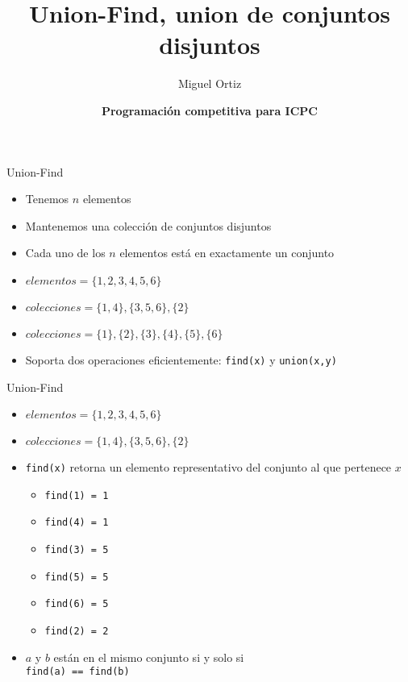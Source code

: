 \documentclass[10pt]{beamer}
\title{Union-Find, union de conjuntos disjuntos}
\author{Miguel Ortiz}
\institute{Mayo 2023 - Cochabamba, Bolivia}
\date{\textbf{Programación competitiva para ICPC}}
\newcommand{\bi}{\begin{itemize}}
\newcommand{\ei}{\end{itemize}}
\begin{document}
\maketitle

\begin{frame}[fragile]{Union-Find}
    \vspace{20pt}
    \bi
        \item Tenemos $n$ elementos
        \item Mantenemos una colección de conjuntos disjuntos
        \item Cada uno de los $n$ elementos está en exactamente un conjunto
        \vspace{10pt}
        \item $elementos = \{1,2,3,4,5,6\}$
        \item $colecciones = \{1,4\}, \{3,5,6\}, \{2\}$
        \item $colecciones = \{1\}, \{2\}, \{3\}, \{4\}, \{5\}, \{6\}$
        \vspace{10pt}
        \item Soporta dos operaciones eficientemente: \texttt{find(x)} y \texttt{union(x,y)}
    \ei
\end{frame}

\begin{frame}{Union-Find}
    \bi
        \vspace{10pt}
        \item $elementos = \{1,2,3,4,5,6\}$
        \item $colecciones = \{1,4\}, \{3,5,6\}, \{2\}$
        \vspace{10pt}
        \item \texttt{find(x)} retorna un elemento representativo del conjunto al que pertenece $x$
            \bi
                \vspace{5pt}
                \item \texttt{find(1) = 1}
                \item \texttt{find(4) = 1}
                \vspace{5pt}
                \item \texttt{find(3) = 5}
                \item \texttt{find(5) = 5}
                \item \texttt{find(6) = 5}
                \vspace{5pt}
                \item \texttt{find(2) = 2}
            \ei
        \vspace{5pt}
        \item $a$ y $b$ están en el mismo conjunto si y solo si \\ \texttt{find(a) == find(b)}
    \ei
\end{frame}
\end{document}
